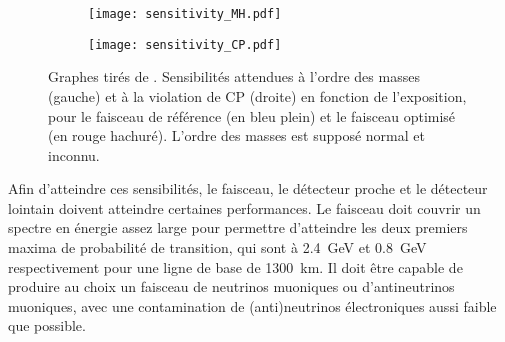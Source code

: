 %        
        \begin{figure}[htbp]
          \begin{subfigure}[t]{0.43\textwidth}
            \texttt{[image: sensitivity\_MH.pdf]}
          \end{subfigure}\hfill
          \begin{subfigure}[t]{0.43\textwidth}
            \texttt{[image: sensitivity\_CP.pdf]}
          \end{subfigure}
          \caption[Sensibilités attendues à l'ordre des masses et à la violation de CP]{\label{fig::sensitivities}Graphes tirés de \cite{Collaboration2015}. Sensibilités attendues à l'ordre des masses (gauche) et à la violation de CP (droite) en fonction de l'exposition, pour le faisceau de référence (en bleu plein) et le faisceau optimisé (en rouge hachuré). L'ordre des masses est supposé normal et inconnu.}
        \end{figure}

        Afin d'atteindre ces sensibilités, le faisceau, le détecteur proche et le détecteur lointain doivent atteindre certaines performances\cite{Collaboration2015}. Le faisceau doit couvrir un spectre en énergie assez large pour permettre d'atteindre les deux premiers maxima de probabilité de transition, qui sont à \SI{2.4}{\giga\electronvolt} et \SI{0.8}{\giga\electronvolt} respectivement pour une ligne de base de \SI{1300}{\kilo\meter}. Il doit être capable de produire au choix un faisceau de neutrinos muoniques ou d'antineutrinos muoniques, avec une contamination de (anti)neutrinos électroniques aussi faible que possible.

